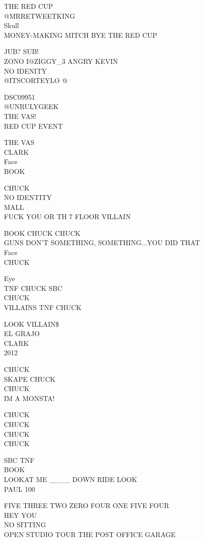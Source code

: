 \documentclass[10pt,letterpaper]{article}
\begin{document}
THE RED CUP\\
@MRRETWEETKING\\
Skull\\
MONEY{-}MAKING MITCH BYE THE RED CUP

JUB? SUB!\\
ZONO I@ZIGGY\_3 ANGRY KEVIN\\
NO IDENITY\\
@ITSCORTEYLO @

DSC09951\\
@UNRULYGEEK\\
THE VAS!\\
RED CUP EVENT

THE VAS\\
CLARK\\
Face\\
BOOK

CHUCK\\
NO IDENTITY\\
MALL\\
FUCK YOU OR TH 7 FLOOR VILLAIN

BOOK CHUCK CHUCK\\
GUNS DON'T SOMETHING, SOMETHING...YOU DID THAT\\
Face\\
CHUCK

Eye\\
TNF CHUCK SBC\\
CHUCK\\
VILLAINS TNF CHUCK

LOOK VILLAIN\$\\
EL GRAJO\\
CLARK\\
2012

CHUCK\\
SKAPE CHUCK\\
CHUCK\\
IM A MONSTA!

CHUCK\\
CHUCK\\
CHUCK\\
CHUCK

SBC TNF\\
BOOK\\
LOOKAT ME \_\_\_\_ DOWN RIDE LOOK\\
PAUL 100

FIVE THREE TWO ZERO FOUR ONE FIVE FOUR\\
HEY YOU\\
NO SITTING\\
OPEN STUDIO TOUR THE POST OFFICE GARAGE
\end{document}
